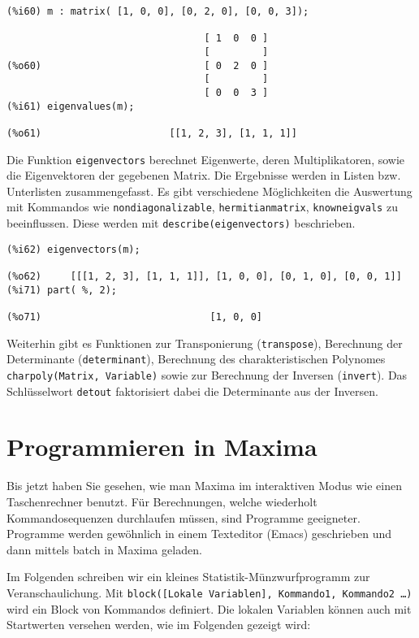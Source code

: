 \documentclass[12pt]{scrartcl}
\begin{document}
\begin{verbatim}
(%i60) m : matrix( [1, 0, 0], [0, 2, 0], [0, 0, 3]);

                                  [ 1  0  0 ]
                                  [         ]
(%o60)                            [ 0  2  0 ]
                                  [         ]
                                  [ 0  0  3 ]
(%i61) eigenvalues(m);

(%o61)                      [[1, 2, 3], [1, 1, 1]]
\end{verbatim}

Die Funktion \texttt{eigenvectors} berechnet Eigenwerte, deren
Multiplikatoren, sowie die Eigenvektoren der gegebenen Matrix. Die
Ergebnisse werden in Listen bzw. Unterlisten zusammengefasst. Es gibt
verschiedene Möglichkeiten die Auswertung mit Kommandos wie
\texttt{nondiagonalizable}, \texttt{hermitianmatrix},
\texttt{knowneigvals} zu beeinflussen. Diese werden mit
\texttt{describe(eigenvectors)} beschrieben.

\begin{verbatim}
(%i62) eigenvectors(m);

(%o62)     [[[1, 2, 3], [1, 1, 1]], [1, 0, 0], [0, 1, 0], [0, 0, 1]]
(%i71) part( %, 2);

(%o71)                             [1, 0, 0]
\end{verbatim}

Weiterhin gibt es Funktionen zur Transponierung (\texttt{transpose}),
Berechnung der Determinante (\texttt{determinant}), Berechnung  des
charakteristischen Polynomes \texttt{charpoly(Matrix, Variable)} sowie
zur Berechnung der Inversen (\texttt{invert}). Das  Schlüsselwort
\texttt{detout} faktorisiert  dabei die Determinante aus der Inversen.

\section{Programmieren in Maxima}

Bis jetzt haben Sie gesehen, wie man Maxima im interaktiven Modus wie
einen Taschenrechner benutzt. Für Berechnungen, welche wiederholt
Kommandosequenzen durchlaufen müssen, sind Programme geeigneter.
Programme werden gewöhnlich in einem Texteditor (Emacs) geschrieben
und dann mittels batch in Maxima geladen.

Im Folgenden schreiben wir ein kleines Statistik-Münzwurfprogramm zur
Veranschaulichung. Mit \texttt{block([Lokale Variablen], Kommando1,  Kommando2 \ldots)} wird
ein Block von Kommandos  definiert. Die lokalen Variablen können auch
mit Startwerten versehen werden, wie im Folgenden gezeigt wird:
\end{document}
